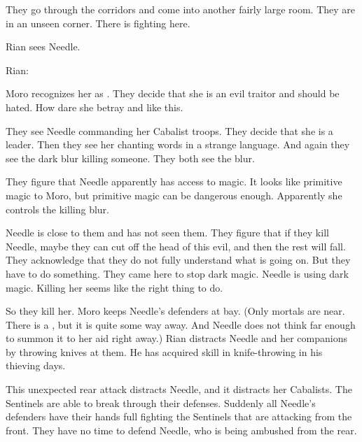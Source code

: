 \begin{comment}
  \subsection{Meeting Needle}
\end{comment}
They go through the corridors and come into another fairly large room.
They are in an unseen corner. 
There is fighting here.

Rian sees Needle.

Rian:

Moro recognizes her as \Piacet. 
They decide that she is an evil traitor and should be hated.
How dare she betray \Malcur and \rinyuth[\Tiroco] like this. 

They see Needle commanding her Cabalist troops. 
They decide that she is a leader. 
Then they see her chanting words in a strange language. 
And again they see the dark blur killing someone. 
They both see the blur. 

They figure that Needle apparently has access to magic. 
It looks like primitive magic to Moro, but primitive magic can be dangerous enough. 
Apparently she controls the killing blur. 

Needle is close to them and has not seen them. 
They figure that if they kill Needle, maybe they can cut off the head of this evil, and then the rest will fall. 
They acknowledge that they do not fully understand what is going on. 
But they have to do something.
They came here to stop dark magic. 
Needle is using dark magic.
Killing her seems like the right thing to do.

\begin{comment}
  \subsection{Killing Needle}
\end{comment}
So they kill her. 
Moro keeps Needle's defenders at bay. 
 (Only mortals are near. 
  There is a \bane, but it is quite some way away.
  And Needle does not think far enough to summon it to her aid right away.)
Rian distracts Needle and her companions by throwing knives at them. 
He has acquired skill in knife-throwing in his thieving days. 

This unexpected rear attack distracts Needle, and it distracts her Cabalists. 
The Sentinels are able to break through their defenses.
Suddenly all Needle's defenders have their hands full fighting the Sentinels that are attacking from the front.
They have no time to defend Needle, who is being ambushed from the rear. 

